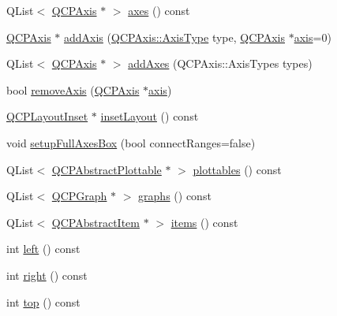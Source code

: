 \begin{DoxyCompactItemize}
\item 
Q\+List$<$ \mbox{\hyperlink{class_q_c_p_axis}{Q\+C\+P\+Axis}} $\ast$ $>$ \mbox{\hyperlink{class_q_c_p_axis_rect_a11657b8faebe9677180860e8057ede26}{axes}} () const
\item 
\mbox{\hyperlink{class_q_c_p_axis}{Q\+C\+P\+Axis}} $\ast$ \mbox{\hyperlink{class_q_c_p_axis_rect_a2dc336092ccc57d44a46194c8a23e4f4}{add\+Axis}} (\mbox{\hyperlink{class_q_c_p_axis_ae2bcc1728b382f10f064612b368bc18a}{Q\+C\+P\+Axis\+::\+Axis\+Type}} type, \mbox{\hyperlink{class_q_c_p_axis}{Q\+C\+P\+Axis}} $\ast$\mbox{\hyperlink{class_q_c_p_axis_rect_a583ae4f6d78b601b732183f6cabecbe1}{axis}}=0)
\item 
Q\+List$<$ \mbox{\hyperlink{class_q_c_p_axis}{Q\+C\+P\+Axis}} $\ast$ $>$ \mbox{\hyperlink{class_q_c_p_axis_rect_a792e1f3d9cb1591fca135bb0de9b81fc}{add\+Axes}} (Q\+C\+P\+Axis\+::\+Axis\+Types types)
\item 
bool \mbox{\hyperlink{class_q_c_p_axis_rect_a03c39cd9704f0d36fb6cf980cdddcbaa}{remove\+Axis}} (\mbox{\hyperlink{class_q_c_p_axis}{Q\+C\+P\+Axis}} $\ast$\mbox{\hyperlink{class_q_c_p_axis_rect_a583ae4f6d78b601b732183f6cabecbe1}{axis}})
\item 
\mbox{\hyperlink{class_q_c_p_layout_inset}{Q\+C\+P\+Layout\+Inset}} $\ast$ \mbox{\hyperlink{class_q_c_p_axis_rect_a949f803466619924c7018df4b511ae10}{inset\+Layout}} () const
\item 
void \mbox{\hyperlink{class_q_c_p_axis_rect_a5fa906175447b14206954f77fc7f1ef4}{setup\+Full\+Axes\+Box}} (bool connect\+Ranges=false)
\item 
Q\+List$<$ \mbox{\hyperlink{class_q_c_p_abstract_plottable}{Q\+C\+P\+Abstract\+Plottable}} $\ast$ $>$ \mbox{\hyperlink{class_q_c_p_axis_rect_a587d073a97b27bc7293fab4b2774ad59}{plottables}} () const
\item 
Q\+List$<$ \mbox{\hyperlink{class_q_c_p_graph}{Q\+C\+P\+Graph}} $\ast$ $>$ \mbox{\hyperlink{class_q_c_p_axis_rect_a2d9ded3eca97be1fcb5867949391bb88}{graphs}} () const
\item 
Q\+List$<$ \mbox{\hyperlink{class_q_c_p_abstract_item}{Q\+C\+P\+Abstract\+Item}} $\ast$ $>$ \mbox{\hyperlink{class_q_c_p_axis_rect_a03c113a2175448300ee8f944e24776ba}{items}} () const
\item 
int \mbox{\hyperlink{class_q_c_p_axis_rect_afb4a3de02046b20b9310bdb8fca781c3}{left}} () const
\item 
int \mbox{\hyperlink{class_q_c_p_axis_rect_a3f819d4a1b2193723d1fdafc573eea10}{right}} () const
\item 
int \mbox{\hyperlink{class_q_c_p_axis_rect_a45dbad181cbb9f09d068dbb76c817c95}{top}} () const

\end{DoxyCompactItemize}
